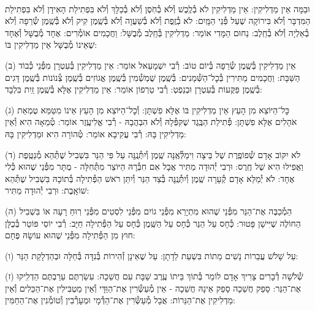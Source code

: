 \documentclass[twoside, openany, parskip=half, 11pt]{book}
\begin{document}
\\
וּבַמָּה אֵין מַדְלִיקִין: אֵין מַדְלִיקִין לֹא בְ֯לֶֽכֶשׁ וְ֯לֹא בְ֯חֹֽסֶן וְ֯לֹא בְ֯כַלָּךְ וְ֯לֹא בִּפְתִילַת הָאִידָן וְ֯לֹא בִּפְתִילַת הַמִּדְבָּר וְ֯לֹא בִּירוֹקָה שֶׁעַל פְּ֯נֵי הַמָּֽיִם: לֹא בְ֯זֶֽפֶת וְ֯לֹא בְ֯שַׁעֲוָה וְ֯לֹא בְּ֯שֶֽׁמֶן קִיק וְ֯לֹא בְּ֯שֶֽׁמֶן שְׂ֯רֵפָה וְ֯לֹא בְ֯אַלְיָה וְ֯לֹא בְ֯חֵֽלֶב: נַחוּם הַמָּדִי אוֹמֵר: מַדְלִיקִין בְּ֯חֵֽלֶב מְ֯בֻשָּׁל: וַחֲכָמִים אוֹמְ֯רִים: אֶחָד מְ֯בֻשָּׁל וְ֯אֶחָד שֶׁאֵינוֹ מְ֯בֻשָּׁל אֵין מַדְלִיקִין בּוֹ:

(ב) אֵין מַדְלִיקִין בְּ֯שֶֽׁמֶן שְׂ֯רֵפָה בְּ֯יוֹם טוֹב: רְ֯בִי יִשְׁמָעֵאל אוֹמֵר: אֵין מַדְלִיקִין בְּ֯עִטְרָן מִפְּ֯נֵי כְּ֯בוֹד הַשַּׁבָּת: וַחֲכָמִים מַתִּירִין בְּ֯כׇל־הַשְּׁ֯מָנִים: בְּ֯שֶֽׁמֶן שֻׁמְשְׁ֯מִין בְּ֯שֶֽׁמֶן אֱגוֹזִים בְּ֯שֶֽׁמֶן צְ֯נוֹנוֹת בְּ֯שֶֽׁמֶן דָּגִים בְּ֯שֶֽׁמֶן פַּקֻּעוֹת בְּ֯עִטְרָן וּבְנֵפְטְ: רְ֯בִי טַרְפוֹן אוֹמֵר: אֵין מַדְלִיקִין אֶלָּא בְּ֯שֶֽׁמֶן זַֽיִת בִּלְבָד:

(ג) כׇּל־הַיּוֹצֵא מִן הָעֵץ אֵין מַדְלִיקִין בּוֹ אֶלָּא פִשְׁתָּן: וְ֯כׇל־הַיּוֹצֵא מִן הָעֵץ אֵינוֹ מִטַּמֵּא טֻמְאַת אֹהָלִים אֶלָּא פִשְׁתָּן: פְּ֯תִילַת הַבֶּֽגֶד שֶׁקִּפְּ֯לָהּ וְ֯לֹא הִבְהֲבָהּ - רְ֯בִי אֱלִיעֶֽזֶר אוֹמֵר: טְ֯מֵאָה הִיא וְ֯אֵין מַדְלִיקִין בָּהּ: רְ֯בִי עֲקִיבָא אוֹמֵר: טְ֯הוֹרָה הִיא וּמַדְלִיקִין בָּהּ:

(ד) לֹא יִקּוֹב אָדָם שְׁ֯פוֹפֶֽרֶת שֶׁל בֵּיצָה וִימַלְּ֯אֶֽנָּה שֶֽׁמֶן וְ֯יִתְּ֯נֶֽנָּה עַל פִּי הַנֵּר בִּשְׁבִיל שֶׁתְּ֯הֵא מְ֯נַטֶּֽפֶת וַאֲפִילוּ הִיא שֶׁל חֶֽרֶס: וּרְבִי יְ֯הוּדָה מַתִּיר אֲבָל אִם חִבְּ֯רָהּ הַיּוֹצֵר מִתְּ֯חִלָּה - מֻתָּר מִפְּ֯נֵי שֶׁהוּא כְּ֯לִי אֶחָד: לֹא יְ֯מַלֵּא אָדָם קְ֯עָרָה שֶֽׁמֶן וְ֯יִתְּ֯נֶֽנָּה בְּ֯צַד הַנֵּר וְ֯יִתֵּן רֹאשׁ הַפְּ֯תִילָה בְּ֯תוֹכָהּ בִּשְׁבִיל שֶׁתְּ֯הֵא שׁוֹאָֽבֶת: וּרְבִי יְ֯הוּדָה מַתִּיר:

(ה) הַמְ֯כַבֶּה אֶת־הַנֵּר מִפְּ֯נֵי שֶׁהוּא מִתְיָרֵא מִפְּ֯נֵי גוֹיִם מִפְּ֯נֵי לִסְטִים מִפְּ֯נֵי רֽוּחַ רָעָה אוֹ בִּשְׁבִיל הַחוֹלֶה שֶׁיִּישָׁן פָּטוּר: כְּ֯חָס עַל הַנֵּר כְּ֯חָס עַל הַשֶּֽׁמֶן כְּ֯חָס עַל הַפְּ֯תִילָה חַיָּב: רְ֯בִי יוֹסֵי פּוֹטֵר בְּ֯כֻלָּן חוּץ מִן הַפְּ֯תִילָה מִפְּ֯נֵי שֶׁהוּא עוֹשָׂהּ פֶּחָם:

(ו) עַל שָׁלֹשׁ עֲבֵרוֹת נָשִׁים מֵתוֹת בִּשְׁעַת לֵדָתָן: עַל שֶׁאֵינָן זְ֯הִירוֹת בְּ֯נִדָּה בְּ֯חַלָּה וּבְהַדְלָקַת הַנֵּר:

(ז) שְׁ֯לֹשָׁה דְ֯בָרִים צָרִיךְ אָדָם לוֹמַר בְּ֯תוֹךְ בֵּיתוֹ עֶֽרֶב שַׁבָּת עִם חֲשֵׁכָה: עִשַׂרְתֶּם עֵרַבְתֶּם הַדְלִֽיקוּ אֶת־הַנֵּר: סָפֵק חֲשֵׁכָה סָפֵק אֵינָהּ חֲשֵׁכָה - אֵין מְ֯עַשְּׂ֯רִין אֶת־הַוַּדָּי וְ֯אֵין מַטְבִּילִין אֶת־הַכֵּלִים וְ֯אֵין מַדְלִיקִין אֶת־הַנֵּרוֹת: אֲבָל מְ֯עַשְּׂ֯רִין אֶת־הַדְּ֯מָי וּמְעָרְ֯בִין וְ֯טוֹמְ֯נִין אֶת־הַחַמִּין:
\end{document}

